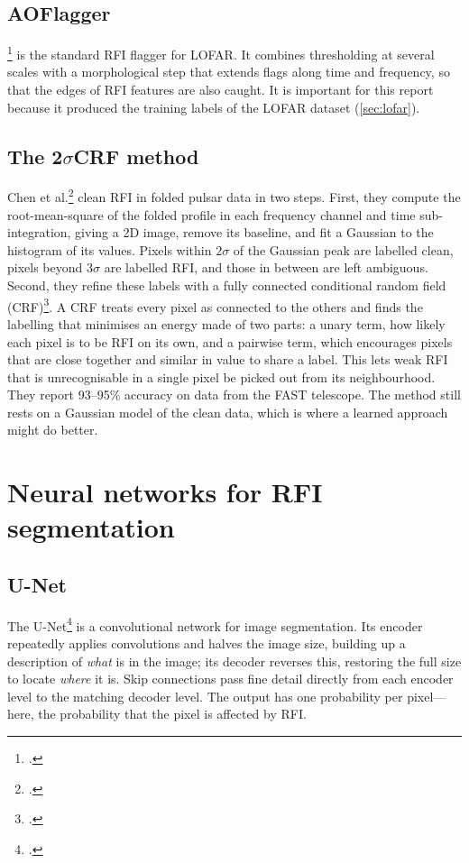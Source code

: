 \subsection{AOFlagger}
\aoflagger{}\footcite{offringa2012} is the standard RFI flagger for LOFAR. It
combines thresholding at several scales with a morphological step that
extends flags along time and frequency, so that the edges of RFI features are
also caught. It is important for this report because it produced the
training labels of the LOFAR dataset (\cref{sec:lofar}).

\subsection{The 2\texorpdfstring{$\sigma$}{-sigma}CRF method}
Chen et al.\footcite{chen2023} clean RFI in folded pulsar data in two steps.
First, they compute the root-mean-square of the folded profile in each
frequency channel and time sub-integration, giving a 2D image, remove its
baseline, and fit a Gaussian to the histogram of its values. Pixels within
$2\sigma$ of the Gaussian peak are labelled clean, pixels beyond $3\sigma$ are
labelled RFI, and those in between are left ambiguous. Second, they refine
these labels with a fully connected conditional random field
(CRF)\footcite{krahenbuhl2011}. A CRF treats every pixel as connected to the
others and finds the labelling that minimises an energy made of two parts: a
unary term, how likely each pixel is to be RFI on its own, and a pairwise
term, which encourages pixels that are close together and similar in value to
share a label. This lets weak RFI that is unrecognisable in a single pixel be
picked out from its neighbourhood. They report 93--95\% accuracy on data from
the FAST telescope. The method still rests on a Gaussian model of the clean
data, which is where a learned approach might do better.

\section{Neural networks for RFI segmentation}

\subsection{U-Net}
The U-Net\footcite{ronneberger2015} is a convolutional network for image
segmentation. Its encoder repeatedly applies convolutions and halves the image
size, building up a description of \emph{what} is in the image; its decoder
reverses this, restoring the full size to locate \emph{where} it is. Skip
connections pass fine detail directly from each encoder level to the matching
decoder level. The output has one probability per pixel---here, the
probability that the pixel is affected by RFI.


